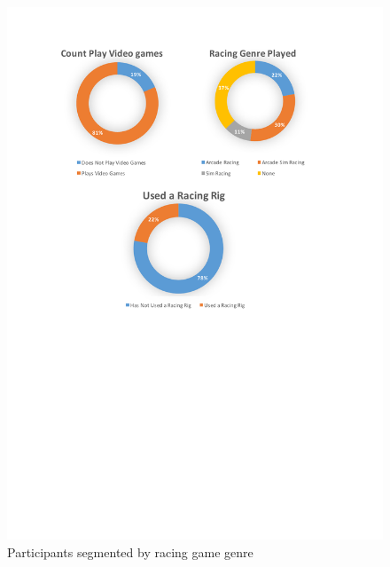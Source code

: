 \begin{figure}
\begin{minipage}{0.45\textwidth}
		\includegraphics[width=\textwidth]{charts/gamesGenrePlayed.pdf}
		\caption[Participants segmented by racing game genre]{Participants segmented by racing game genre}
		\label{fig:chart-gamesGenrePlayed}
	\end{minipage}
\end{figure}

